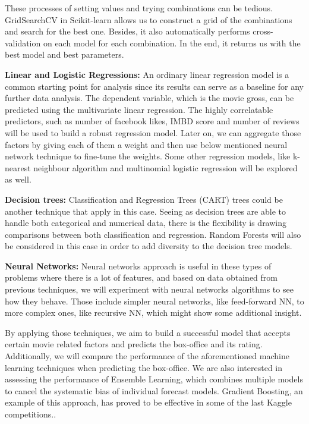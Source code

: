 These processes of setting values and trying combinations can be tedious. GridSearchCV in Scikit-learn allows us to construct a grid of the combinations and search for the best one. Besides, it also automatically performs cross-validation on each model for each combination. In the end, it returns us with the best model and best parameters.

\textbf{Linear and Logistic Regressions:}
An ordinary linear regression model is a common starting point for analysis since its results can serve as a baseline for any further data analysis. The dependent variable, which is the movie gross, can be predicted using the multivariate linear regression. The highly correlatable predictors, such as number of facebook likes, IMBD score and number of reviews will be used to build a robust regression model. Later on, we can aggregate those factors by giving each of them a weight and then use below mentioned neural network technique to fine-tune the weights. Some other regression models, like k-nearest neighbour algorithm and multinomial logistic regression will be explored as well.

\textbf{Decision trees:}
Classification and Regression Trees (CART) trees could be another technique that apply in this case. Seeing as decision trees are able to handle both categorical and numerical data, there is the flexibility is drawing comparisons between both classification and regression.  Random Forests will also be considered in this case in order to add diversity to the decision tree models. 

\textbf{Neural Networks:}
Neural networks approach is useful in these types of problems where there is a lot of features, and based on data obtained from previous techniques, we will experiment with neural networks algorithms to see how they behave. Those include simpler neural networks, like feed-forward NN, to more complex ones, like recursive NN, which might show some additional insight.

By applying those techniques, we aim to build a successful model that accepts certain movie related factors and predicts the box-office and its rating. Additionally, we will compare the performance of the aforementioned machine learning techniques when predicting the box-office. We are also interested in assessing the performance of Ensemble Learning, which combines multiple models to cancel the systematic bias of individual forecast models. Gradient Boosting, an example of this approach, has proved to be effective in some of the last Kaggle competitions..
